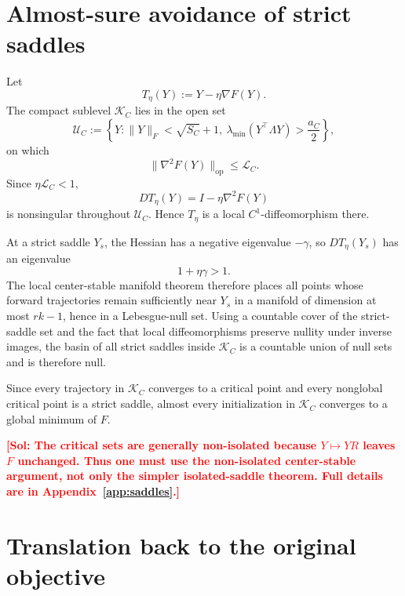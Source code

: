 \documentclass[11pt]{article}
\newcommand{\cK}{\mathcal{K}}
\newcommand{\cU}{\mathcal{U}}
\newcommand{\sol}[1]{\textcolor{red}{\textbf{[Sol: #1]}}}
\begin{document}
\section{Almost-sure avoidance of strict saddles}

Let
\[
T_\eta(Y)
:=
Y-\eta\nabla F(Y).
\]
The compact sublevel \(\cK_C\) lies in the open set
\[
\cU_C
:=
\left\{
Y:\|Y\|_F<\sqrt{S_C}+1,
\ \lambda_{\min}(Y^\top\Lambda Y)>\frac{a_C}{2}
\right\},
\]
on which
\[
\|\nabla^2F(Y)\|_{\mathrm{op}}\le\mathcal L_C.
\]
Since \(\eta\mathcal L_C<1\),
\[
DT_\eta(Y)
=
I-\eta\nabla^2F(Y)
\]
is nonsingular throughout \(\cU_C\). Hence \(T_\eta\) is a local
\(C^1\)-diffeomorphism there.

At a strict saddle \(Y_s\), the Hessian has a negative eigenvalue
\(-\gamma\), so \(DT_\eta(Y_s)\) has an eigenvalue
\[
1+\eta\gamma>1.
\]
The local center-stable manifold theorem therefore places all points whose
forward trajectories remain sufficiently near \(Y_s\) in a manifold of
dimension at most \(rk-1\), hence in a Lebesgue-null set. Using a countable
cover of the strict-saddle set and the fact that local diffeomorphisms preserve
nullity under inverse images, the basin of all strict saddles inside
\(\cK_C\) is a countable union of null sets and is therefore null.

Since every trajectory in \(\cK_C\) converges to a critical point and every
nonglobal critical point is a strict saddle, almost every initialization in
\(\cK_C\) converges to a global minimum of \(F\).

\sol{The critical sets are generally non-isolated because \(Y\mapsto YR\) leaves \(F\) unchanged. Thus one must use the non-isolated center-stable argument, not only the simpler isolated-saddle theorem. Full details are in Appendix~\ref{app:saddles}.}

\section{Translation back to the original objective}
\label{sec:translation-back}
\end{document}
